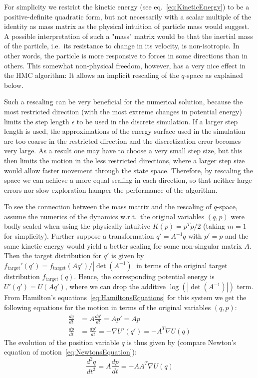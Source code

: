 For simplicity we restrict the kinetic energy (see eq.~\eqref{eq:KineticEnergy}) to be a positive-definite quadratic form, but not necessarily with a scalar multiple of the identity as mass matrix as the physical intuition of particle mass would suggest. A possible interpretation of such a "mass" matrix would be that the inertial mass of the particle, i.e.\ its resistance to change in its velocity, is non-isotropic. In other words, the particle is more responsive to forces in some directions than in others. This somewhat non-physical freedom, however, has a very nice effect in the HMC algorithm: It allows an implicit rescaling of the $q$-space as explained below.

Such a rescaling can be very beneficial for the numerical solution, because the most restricted direction (with the most extreme changes in potential energy) limits the step length $\epsilon$ to be used in the discrete simulation. If a larger step length is used, the approximations of the energy surface used in the simulation are too coarse in the restricted direction and the discretization error becomes very large. As a result one may have to choose a very small step size, but this then limits the motion in the less restricted directions, where a larger step size would allow faster movement through the state space. Therefore, by rescaling the space we can achieve a more equal scaling in each direction, so that neither large errors nor slow exploration hamper the performance of the algorithm.

To see the connection between the mass matrix and the rescaling of $q$-space, assume the numerics of the dynamics w.r.t.\ the original variables $(q, p)$ were badly scaled when using the physically intuitive $K(p) = p^T p/2$ (taking $m=1$ for simplicity). Further suppose a transformation $q' = A^{-1} q$ with $p'=p$ and the same kinetic energy would yield a better scaling for some non-singular matrix $A$. Then the target distribution for $q'$ is given by $f_\textrm{target}'(q') = f_\textrm{target}(Aq')/|\det(A^{-1})|$ in terms of the original target distribution $f_\textrm{target}(q)$. Hence, the corresponding potential energy is $U'(q') = U(Aq')$, where we can drop the additive $\log(|\det(A^{-1})|)$ term. From Hamilton's equations~\eqref{eq:HamiltonsEquations} for this system we get the following equations for the motion in terms of the original variables $(q, p)$:
\begin{equation}
\begin{split}
\frac{dq}{dt} &= A \frac{dq'}{dt} = Ap' = Ap \\
\frac{dp}{dt} &= \frac{dp'}{dt} = - \nabla U'(q') = - A^T \nabla U(q)
\end{split}
\end{equation}
The evolution of the position variable $q$ is thus given by (compare Newton's equation of motion~\eqref{eq:NewtonsEquation}):
\begin{equation} \label{eq:EvolutionQTransformed}
\frac{d^2q}{dt^2} = A \frac{dp}{dt} = - A A^T \nabla U(q)
\end{equation}

